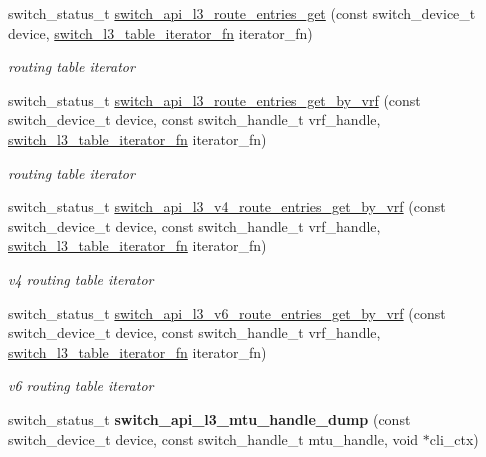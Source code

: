 \begin{DoxyCompactItemize}
\item 
switch\+\_\+status\+\_\+t \hyperlink{group__L3_ga65f0364574c605a8ea536d7363691044}{switch\+\_\+api\+\_\+l3\+\_\+route\+\_\+entries\+\_\+get} (const switch\+\_\+device\+\_\+t device, \hyperlink{group__L3_ga0aea3e3c894c8de43078d00eaa9c263d}{switch\+\_\+l3\+\_\+table\+\_\+iterator\+\_\+fn} iterator\+\_\+fn)
\begin{DoxyCompactList}\small\item\em routing table iterator \end{DoxyCompactList}\item 
switch\+\_\+status\+\_\+t \hyperlink{group__L3_ga3de4e6734c008c903b0565088b564a69}{switch\+\_\+api\+\_\+l3\+\_\+route\+\_\+entries\+\_\+get\+\_\+by\+\_\+vrf} (const switch\+\_\+device\+\_\+t device, const switch\+\_\+handle\+\_\+t vrf\+\_\+handle, \hyperlink{group__L3_ga0aea3e3c894c8de43078d00eaa9c263d}{switch\+\_\+l3\+\_\+table\+\_\+iterator\+\_\+fn} iterator\+\_\+fn)
\begin{DoxyCompactList}\small\item\em routing table iterator \end{DoxyCompactList}\item 
switch\+\_\+status\+\_\+t \hyperlink{group__L3_ga083855ef78bebef8a14270981945476b}{switch\+\_\+api\+\_\+l3\+\_\+v4\+\_\+route\+\_\+entries\+\_\+get\+\_\+by\+\_\+vrf} (const switch\+\_\+device\+\_\+t device, const switch\+\_\+handle\+\_\+t vrf\+\_\+handle, \hyperlink{group__L3_ga0aea3e3c894c8de43078d00eaa9c263d}{switch\+\_\+l3\+\_\+table\+\_\+iterator\+\_\+fn} iterator\+\_\+fn)
\begin{DoxyCompactList}\small\item\em v4 routing table iterator \end{DoxyCompactList}\item 
switch\+\_\+status\+\_\+t \hyperlink{group__L3_gaa5ccd0b07a6b9b4eb5aa20936be9d81f}{switch\+\_\+api\+\_\+l3\+\_\+v6\+\_\+route\+\_\+entries\+\_\+get\+\_\+by\+\_\+vrf} (const switch\+\_\+device\+\_\+t device, const switch\+\_\+handle\+\_\+t vrf\+\_\+handle, \hyperlink{group__L3_ga0aea3e3c894c8de43078d00eaa9c263d}{switch\+\_\+l3\+\_\+table\+\_\+iterator\+\_\+fn} iterator\+\_\+fn)
\begin{DoxyCompactList}\small\item\em v6 routing table iterator \end{DoxyCompactList}\item 
\hypertarget{group__L3_gaeefb3032d9af5cf67af7d0baa2cce5c0}{switch\+\_\+status\+\_\+t {\bfseries switch\+\_\+api\+\_\+l3\+\_\+mtu\+\_\+handle\+\_\+dump} (const switch\+\_\+device\+\_\+t device, const switch\+\_\+handle\+\_\+t mtu\+\_\+handle, void $\ast$cli\+\_\+ctx)}\label{group__L3_gaeefb3032d9af5cf67af7d0baa2cce5c0}

\end{DoxyCompactItemize}


